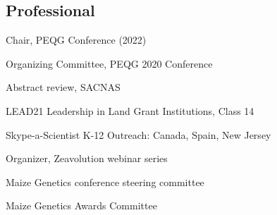 \documentclass[letterpaper,10pt]{article}
\renewenvironment{itemize}{
  \begin{list}{}{
    \setlength{\leftmargin}{1.5em}
  }
}{
  \end{list}
}
\begin{document}
\begin{itemize}
\subsection*{Professional}
\item Chair, PEQG Conference (2022)%
\item Organizing Committee, PEQG 2020 Conference%
\item Abstract review, SACNAS
\item LEAD21 Leadership in Land Grant Institutions, Class 14%
\item Skype-a-Scientist K-12 Outreach: Canada, Spain, New Jersey%
\item Organizer, Zeavolution webinar series
\item Maize Genetics conference steering committee%
\item Maize Genetics Awards Committee%

\end{itemize}
\end{document}
